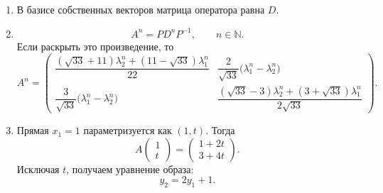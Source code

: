 \begin{enumerate}
\begin{enumerate}[label=\arabic*)]
\item В базисе собственных векторов матрица оператора равна \(D\).

\item
\[
A^n=PD^nP^{-1},\qquad n\in\mathbb N.
\]
Если раскрыть это произведение, то
\[
A^n=
\begin{pmatrix}
\dfrac{(\sqrt{33}+11)\lambda_2^n+(11-\sqrt{33})\lambda_1^n}{22}
&
\dfrac{2}{\sqrt{33}}\bigl(\lambda_1^n-\lambda_2^n\bigr)
\\[3mm]
\dfrac{3}{\sqrt{33}}\bigl(\lambda_1^n-\lambda_2^n\bigr)
&
\dfrac{(\sqrt{33}-3)\lambda_2^n+(3+\sqrt{33})\lambda_1^n}{2\sqrt{33}}
\end{pmatrix}.
\]

\item Прямая \(x_1=1\) параметризуется как \((1,t)\). Тогда
\[
A\begin{pmatrix}1\\t\end{pmatrix}
=
\begin{pmatrix}1+2t\\3+4t\end{pmatrix}.
\]
Исключая \(t\), получаем уравнение образа:
\[
y_2=2y_1+1.
\]
\end{enumerate}
\end{enumerate}
